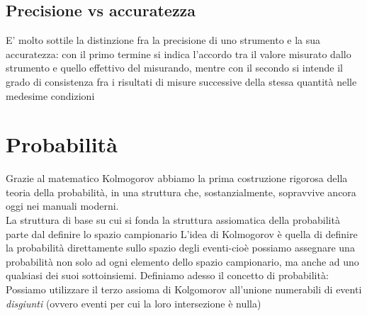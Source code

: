 \documentclass{report}
\begin{document}
	\section{Precisione vs accuratezza}
	E' molto sottile la distinzione fra la precisione di uno strumento e la sua accuratezza: con il primo termine si indica l'accordo tra il valore misurato dallo strumento e quello effettivo del misurando, mentre con il secondo si intende il grado di consistenza fra i risultati di misure successive della stessa quantità nelle medesime condizioni
	\chapter{Probabilità}
	Grazie al matematico Kolmogorov abbiamo la prima costruzione rigorosa della teoria della probabilità, in una struttura che, sostanzialmente, sopravvive ancora oggi nei manuali moderni. \\
	La struttura di base su cui si fonda la struttura assiomatica della probabilità parte dal definire lo spazio campionario
\noindent L'idea di Kolmogorov è quella di definire la probabilità direttamente sullo spazio degli eventi-cioè possiamo assegnare una probabilità non solo ad ogni elemento dello spazio campionario, ma anche ad uno qualsiasi dei suoi sottoinsiemi.
	Definiamo adesso il concetto di probabilità:
\noindent Possiamo utilizzare il terzo assioma di Kolgomorov all'unione numerabili di eventi \emph{disgiunti} (ovvero eventi per cui la loro intersezione è nulla)
\end{document}
